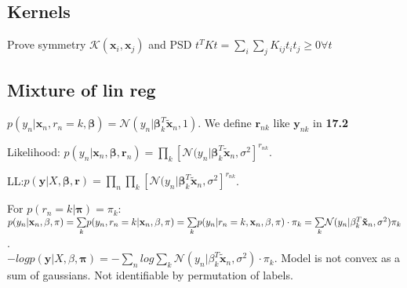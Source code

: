 \subsection{Kernels}
Prove symmetry $\mathcal{K}(\mathbf{x}_i, \mathbf{x}_j)$ and PSD $t^T K t = \sum_i \sum_j K_{ij} t_i t_j \geq 0 \forall t$

\subsection{Mixture of lin reg}
$p(y_n|\mathbf{x}_n, r_n = k, \mathbf{\beta}) = \mathcal{N}(y_n|\mathbf{\beta}_k^T \mathbf{\tilde{x}}_n, 1)$. We define $\mathbf{r}_{nk}$ like $\mathbf{y}_{nk}$ in \textbf{17.2}

Likelihood: \newline $p(y_n|\mathbf{x}_n, \mathbf{\beta}, \mathbf{r}_n) = \underset{k}{\prod} [\mathcal{N}(y_n|\mathbf{\beta}_k^T \mathbf{\tilde{x}}_n , \sigma^2]^{r_{nk}}$. 

LL:\newline $p(\mathbf{y}|X, \mathbf{\beta}, \mathbf{r}) = \underset{n}{\prod} \underset{k}{\prod} [\mathcal{N}(y_n|\mathbf{\beta}_k^T \mathbf{\tilde{x}}_n , \sigma^2]^{r_{nk}}$. 

For $p(r_n = k | \mathbf{\pi}) = \pi_k$: \newline
$p(y_n|\mathbf{x}_n, \mathbf{\beta}, \mathbf{\pi}) = \underset{k}{\sum} p(y_n, r_n = k| \mathbf{x}_n, \beta, \mathbf{\pi}) \newline = \underset{k}{\sum} p(y_n | r_n = k, \mathbf{x}_n, \beta, \pi) \cdot \pi_k \newline = \underset{k}{\sum} \mathcal{N}(y_n|\beta^T_k \mathbf{\tilde{x}}_n, \sigma^2) \pi_k$.\\

$- log p(\mathbf{y} | X, \beta, \mathbf{\pi}) = -\underset{n}{\sum} log \underset{k}{\sum} \mathcal{N}(y_n|\beta^T_k \mathbf{\tilde{x}}_n, \sigma^2) \cdot \pi_k$.
Model is not convex as a sum of gaussians. Not identifiable by permutation of labels.



